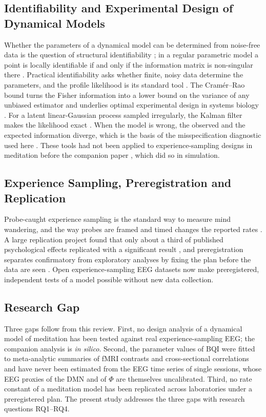 \subsection{Identifiability and Experimental Design of Dynamical Models}
Whether the parameters of a dynamical model can be determined from noise-free data is the question of structural identifiability \cite{Bellman1970}; in a regular parametric model a point is locally identifiable if and only if the information matrix is non-singular there \cite{Rothenberg1971}. Practical identifiability asks whether finite, noisy data determine the parameters, and the profile likelihood is its standard tool \cite{Raue2009,Wieland2021}. The Cram\'er--Rao bound \cite{Rao1945,Cramer1946} turns the Fisher information into a lower bound on the variance of any unbiased estimator and underlies optimal experimental design in systems biology \cite{Kreutz2009}. For a latent linear-Gaussian process sampled irregularly, the Kalman filter makes the likelihood exact \cite{Kalman1960,Harvey1989,Durbin2012}. When the model is wrong, the observed and the expected information diverge, which is the basis of the misspecification diagnostic used here \cite{White1982}. These tools had not been applied to experience-sampling designs in meditation before the companion paper \cite{companion}, which did so in simulation.

\subsection{Experience Sampling, Preregistration and Replication}
Probe-caught experience sampling is the standard way to measure mind wandering, and the way probes are framed and timed changes the reported rates \cite{Weinstein2018}. A large replication project found that only about a third of published psychological effects replicated with a significant result \cite{OSC2015}, and preregistration separates confirmatory from exploratory analyses by fixing the plan before the data are seen \cite{Nosek2018}. Open experience-sampling EEG datasets \cite{Delorme2024ds,RodriguezLarios2021} now make preregistered, independent tests of a model possible without new data collection.

\subsection{Research Gap}
\label{sec:gap}
Three gaps follow from this review. First, no design analysis of a dynamical model of meditation has been tested against real experience-sampling EEG; the companion analysis is \emph{in silico}. Second, the parameter values of BQI were fitted to meta-analytic summaries of fMRI contrasts and cross-sectional correlations \cite[Sec.~7.2--7.5]{BQI} and have never been estimated from the EEG time series of single sessions, whose EEG proxies of the DMN and of $\Phi$ are themselves uncalibrated. Third, no rate constant of a meditation model has been replicated across laboratories under a preregistered plan. The present study addresses the three gaps with research questions RQ1--RQ4.
